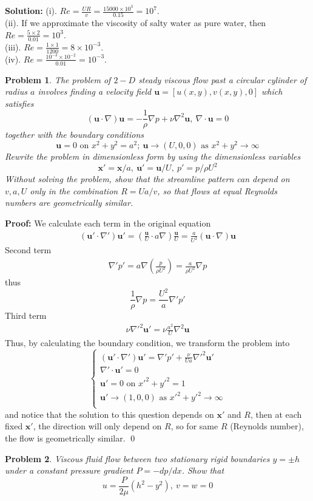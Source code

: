\documentclass[12pt]{article}
\newtheorem{problem}{Problem}
\begin{document}
\textbf{Solution:} (i). $Re=\frac{UR}{v}=\frac{15000\times 10^3}{0.15}=10^7$. \\
(ii). If we approximate the viscosity of salty water as pure water, then $Re=\frac{5\times 2}{0.01}=10^3$. \\
(iii). $Re=\frac{1\times 1}{1200}=8\times 10^{-3}$. \\
(iv). $Re=\frac{10^{-3}\times 10^{-2}}{0.01}=10^{-3}$.
\\
\begin{problem}
    The problem of $2-D$ steady viscous flow past a circular cylinder of radius $a$ involves finding a velocity field $\textbf{u}=[u(x,y),v(x,y), 0]$ which satisfies 
    $$
        (\textbf{u}\cdot\nabla)\textbf{u}=-\frac{1}{\rho}\nabla p+\nu\nabla^2\textbf{u}, \ \nabla\cdot \textbf{u}=0
    $$
    together with the boundary conditions 
    $$
        \textbf{u}=0\text{ on } x^2+y^2=a^2; \ \textbf{u}\to(U,0,0)\text{ as } x^2+y^2\to \infty
    $$
    Rewrite the problem in dimensionless form by using the dimensionless variables
    $$
        \textbf{x}'=\textbf{x}/a, \ \textbf{u}'=\textbf{u}/U, \ p'=p/\rho U^2
    $$
    Without solving the problem, show that the streamline pattern can depend on $v,a,U$ only in the combination $R=Ua/v$, so that flows at equal Reynolds numbers are geometrically similar.
\end{problem}

\textbf{Proof:} We calculate each term in the original equation
\begin{align*}
    (\textbf{u}'\cdot\nabla')\textbf{u}'=\left(\frac{\textbf{u}}{U}\cdot a\nabla\right)\frac{\textbf{u}}{U}=\frac{a}{U^2}(\textbf{u}\cdot\nabla)\textbf{u}
\end{align*}
Second term
\begin{align*}
    \nabla' p'=a\nabla\left(\frac{p}{\rho U^2}\right)=\frac{a}{\rho U^2}\nabla p
\end{align*}
thus 
$$
    \frac{1}{\rho}\nabla p=\frac{U^2}{a}\nabla'p'
$$
Third term
\begin{align*}
    \nu\nabla'^2\textbf{u}'=\nu \frac{a^2}{U}\nabla^2\textbf{u}
\end{align*}
Thus, by calculating the boundary condition, we transform the problem into 
$$
\left\{\begin{matrix}
 (\textbf{u}'\cdot\nabla')\textbf{u}'=\nabla'p'+\frac{\nu}{Ua}\nabla'^2\textbf{u}'\\
 \nabla'\cdot\textbf{u}'=0\\
 \textbf{u}'=0 \text{ on } x'^2+y'^2=1\\
  \textbf{u}'\to (1, 0, 0)\text{ as } x'^2+y'^2\to\infty\\
\end{matrix}\right.
$$
and notice that the solution to this question depends on $\textbf{x}'$ and $R$, then at each fixed $\textbf{x}'$, the direction will only depend on $R$, so for same $R$ (Reynolds number), the flow is geometrically similar. \qed
\\
\begin{problem}
    Viscous fluid flow between two stationary rigid boundaries $y=\pm h$ under a constant pressure gradient $P=-dp/dx$. Show that 
    $$
        u=\frac{P}{2\mu}(h^2-y^2), \ v=w=0
    $$
\end{problem}
\end{document}
